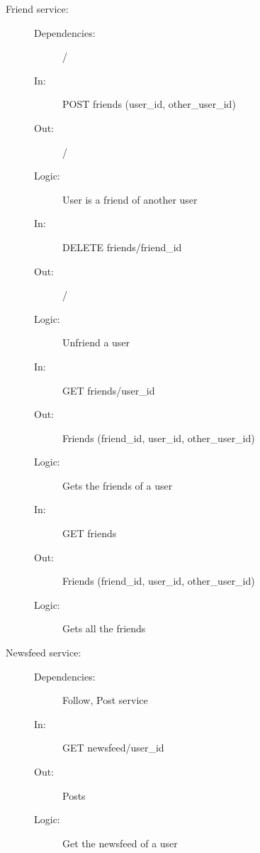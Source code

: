 \documentclass{article}
\begin{document}
\begin{description}
    \item [Friend service:]
    \begin{description}
        \item[]
        \item[Dependencies:] /
    \end{description} 
    \begin{description}
        \item[]
        \item[In:] POST friends (user\_id, other\_user\_id)
        \item[Out:] /
        \item[Logic:] User is a friend of another user
        \item[]
    \end{description}
    \begin{description}
        \item[In:] DELETE friends/friend\_id
        \item[Out:] /
        \item[Logic:] Unfriend a user
        \item[]
    \end{description}
    \begin{description}
        \item[In:] GET friends/user\_id
        \item[Out:] Friends (friend\_id, user\_id, other\_user\_id)
        \item[Logic:] Gets the friends of a user
        \item[]
    \end{description}
    \begin{description}
        \item[In:] GET friends
        \item[Out:] Friends (friend\_id, user\_id, other\_user\_id)
        \item[Logic:] Gets all the friends
    \end{description}
\end{description}

\begin{description}
    \item [Newsfeed service:] 
    \begin{description}
        \item[]
        \item[Dependencies:] Follow, Post service
    \end{description}
    \begin{description}
        \item[]
        \item[In:] GET newsfeed/user\_id
        \item[Out:] Posts
        \item[Logic:] Get the newsfeed of a user
    \end{description}
\end{description}
\end{document}
